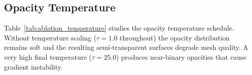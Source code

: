 \documentclass{llmxive}
\begin{document}
\begin{table}[!htbp]
\centering
{}
\caption{\textbf{Ablation on blur scheduling} (RE10K, 6 views).}
\label{tab:ablation_blur}
\end{table}




\subsection{Opacity Temperature}
\label{sec:app_ablation_temperature}

Table~\ref{tab:ablation_temperature} studies the opacity temperature schedule. Without temperature scaling ($\tau = 1.0$ throughout) the opacity distribution remains soft and the resulting semi-transparent surfaces degrade mesh quality. A very high final temperature ($\tau = 25.0$) produces near-binary opacities that cause gradient instability.

\begin{table}[!htbp]
\centering
{}
\caption{\textbf{Ablation on opacity temperature} (RE10K, 6 views).}
\label{tab:ablation_temperature}
\end{table}
\end{document}
